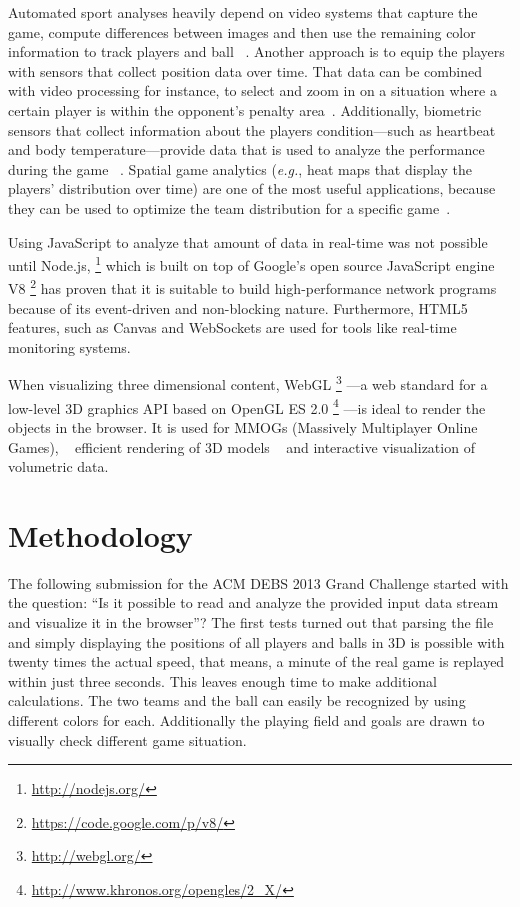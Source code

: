 \documentclass{sig-alternate}
\newcommand{\inlinelistingsize}{\fontsize{8pt}{11pt}}
\let\oldurl\url
\renewcommand{\url}[1]{\inlinelistingsize\oldurl{#1}}
\begin{document}
Automated sport analyses heavily depend on video systems
that capture the game, compute differences between images
and then use the remaining color information
to track players and ball%
~\cite{Huang:2007:PBD:1776594.1776646,Liang:2005:SBD:2163110.2163186}.
Another approach is to equip the players with sensors
that collect position data over time.
That data can be combined with video processing for instance,
to select and zoom in on a situation where a certain player
is within the opponent's penalty area~\cite{ragnar2012football}.
Additionally, biometric sensors that collect information
about the players condition---such as heartbeat
and body temperature---provide data that is used
to analyze the performance during the game~%
\cite{alonso2010sportstelemetry}.
Spatial game analytics (\emph{e.g.}, heat maps
that display the players’ distribution over time)
are one of the most useful applications,
because they can be used to optimize the team distribution
for a specific game~\cite{elnasr2013spatialgame}.

Using JavaScript to analyze that amount of data in real-time
was not possible until Node.js,%
\footnote{\url{http://nodejs.org/}}
which is built on top of Google's open source JavaScript engine V8%
\footnote{\url{https://code.google.com/p/v8/}}
has proven that it is suitable to build
high-performance network programs%
~\cite{tilkov2010node}
because of its event-driven and non-blocking nature.
Furthermore, HTML5 features, such as Canvas and WebSockets
are used for tools like real-time monitoring systems.%
~\cite{cha2013developing}

When visualizing three dimensional content,
WebGL%
\footnote{\url{http://webgl.org/}}
---a web standard for a low-level 3D graphics API
based on OpenGL ES 2.0%
\footnote{\url{http://www.khronos.org/opengles/2_X/}}
---is ideal to render the objects
in the browser.
It is used for MMOGs (Massively Multiplayer Online Games),%
~\cite{chenwebgl}
efficient rendering of 3D models%
~\cite{sawicki2013efficient}
and interactive visualization of volumetric data.%
~\cite{congote2011interactive}

\section{Methodology}
\label{sec:methodology}

The following submission for the ACM DEBS 2013 Grand Challenge
started with the question: ``Is it possible to read and analyze
the provided input data stream and visualize it in the browser''?
The first tests turned out that parsing the file
and simply displaying the positions of all players
and balls in 3D is possible with twenty times the actual speed,
that means, a minute of the real game is replayed
within just three seconds.
This leaves enough time to make additional calculations.
The two teams and the ball can easily be recognized
by using different colors for each.
Additionally the playing field and goals are drawn
to visually check different game situation.
\end{document}

